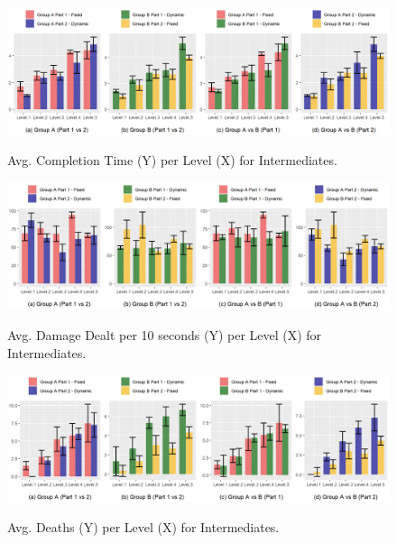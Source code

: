 \begin{figure}[!ht]
    \begin{center}
    \caption{Avg. Completion Time (Y) per Level (X) for Intermediates.}
        \includegraphics[width=34em]{figures/completion_time-intermediate_players.png}
        \label{fig:result-metric-intermediates-completion-time}
    \end{center}
\end{figure}

\begin{figure}[!ht]
    \begin{center}
    \caption{Avg. Damage Dealt per 10 seconds (Y) per Level (X) for Intermediates.}
        \includegraphics[width=34em]{figures/damage_dealt_per_10s-intermediate_players.png}
        \label{fig:result-metric-intermediates-damage-dealt-per-10s}
    \end{center}
\end{figure}

\begin{figure}[!ht]
    \begin{center}
    \caption{Avg. Deaths (Y) per Level (X) for Intermediates.}
        \includegraphics[width=34em]{figures/deaths_per_level-intermediate_players.png}
        \label{fig:result-metric-intermediates-deaths-per-level}
    \end{center}
\end{figure}

